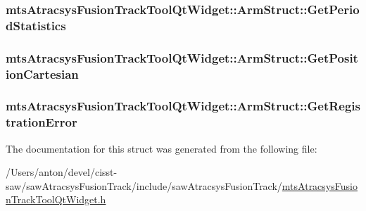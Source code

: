 \subsubsection[{Get\+Period\+Statistics}]{ mts\+Atracsys\+Fusion\+Track\+Tool\+Qt\+Widget\+::\+Arm\+Struct\+::\+Get\+Period\+Statistics}\label{structmts_atracsys_fusion_track_tool_qt_widget_1_1_arm_struct_a750ef720c7009f7277bfb8833249dda6}
\hypertarget{structmts_atracsys_fusion_track_tool_qt_widget_1_1_arm_struct_ac06e18b6a338d1c54cd11d811bdf87b7}{}
\subsubsection[{Get\+Position\+Cartesian}]{ mts\+Atracsys\+Fusion\+Track\+Tool\+Qt\+Widget\+::\+Arm\+Struct\+::\+Get\+Position\+Cartesian}\label{structmts_atracsys_fusion_track_tool_qt_widget_1_1_arm_struct_ac06e18b6a338d1c54cd11d811bdf87b7}
\hypertarget{structmts_atracsys_fusion_track_tool_qt_widget_1_1_arm_struct_a81acb90857b57d46a5dd363f92e4316f}{}
\subsubsection[{Get\+Registration\+Error}]{ mts\+Atracsys\+Fusion\+Track\+Tool\+Qt\+Widget\+::\+Arm\+Struct\+::\+Get\+Registration\+Error}\label{structmts_atracsys_fusion_track_tool_qt_widget_1_1_arm_struct_a81acb90857b57d46a5dd363f92e4316f}


The documentation for this struct was generated from the following file\+:\begin{DoxyCompactItemize}
\item 
/\+Users/anton/devel/cisst-\/saw/saw\+Atracsys\+Fusion\+Track/include/saw\+Atracsys\+Fusion\+Track/\hyperlink{mts_atracsys_fusion_track_tool_qt_widget_8h}{mts\+Atracsys\+Fusion\+Track\+Tool\+Qt\+Widget.\+h}\end{DoxyCompactItemize}
